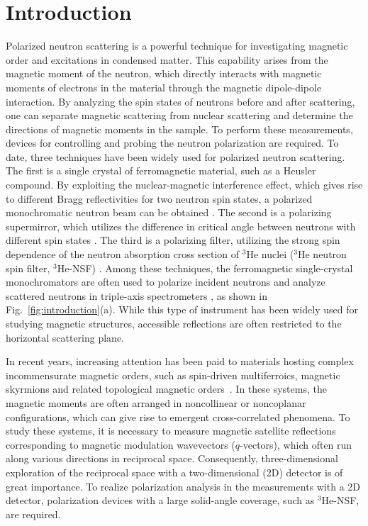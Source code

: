 \documentclass[%
 reprint,
superscriptaddress,
 amsmath,amssymb,
 aps,
floatfix,
]{revtex4-2}
\newcommand{\He}{$^3$He }
\newcommand{\Hensf}{$^3$He-NSF}
\begin{document}
\section{Introduction}
Polarized neutron scattering is a powerful technique for investigating magnetic order and excitations in condensed matter.
This capability arises from the magnetic moment of the neutron, which directly interacts with magnetic moments of electrons in the material through the magnetic dipole-dipole interaction.
By analyzing the spin states of neutrons before and after scattering, one can separate magnetic scattering from nuclear scattering and determine the directions of magnetic moments in the sample.
To perform these measurements, devices for controlling and probing the neutron polarization are required.
To date, three techniques have been widely used for polarized neutron scattering.
The first is a single crystal of ferromagnetic material, such as a  Heusler compound.
By exploiting the nuclear-magnetic interference effect, which gives rise to different Bragg reflectivities for two neutron spin states, a polarized monochromatic neutron beam can be obtained \cite{squires1996introduction}.
The second is a polarizing supermirror, which utilizes the difference in critical angle between neutrons with different spin states \cite{mezei1976novel}.
The third is a polarizing filter, utilizing the strong spin dependence of the neutron absorption cross section of \He nuclei (\He neutron spin filter, \Hensf) \cite{gentile2017optically}.
Among these techniques, the ferromagnetic single-crystal monochromators are often used to polarize incident neutrons and analyze scattered neutrons in triple-axis spectrometers \cite{kulda_in20_2002,faulhaber_polarized_2010,fernandez-baca_triple-axis_2008,takeda_double_2008,nakajima_polarized_2024}, as shown in Fig.~\ref{fig:introduction}(a).
While this type of instrument has been widely used for studying magnetic structures, accessible reflections are often restricted to the horizontal scattering plane.

In recent years, increasing attention has been paid to materials hosting complex incommensurate magnetic orders, such as spin-driven multiferroics, magnetic skyrmions and related topological magnetic orders~\cite{muhlbauer_skyrmion_2009,tokura_multiferroics_2014,kanazawa_direct_2020,fujishiro_topological_2019,kurumaji_electronic_2025}.
In these systems, the magnetic moments are often arranged in noncollinear or noncoplanar configurations, which can give rise to emergent cross-correlated phenomena.
To study these systems, it is necessary to measure magnetic satellite reflections corresponding to magnetic modulation wavevectors ($q$-vectors), which often run along various directions in reciprocal space.
Consequently, three-dimensional exploration of the reciprocal space with a two-dimensional (2D) detector is of great importance.
To realize polarization analysis in the measurements with a 2D detector, polarization devices with a large solid-angle coverage, such as \Hensf, are required.
\end{document}
